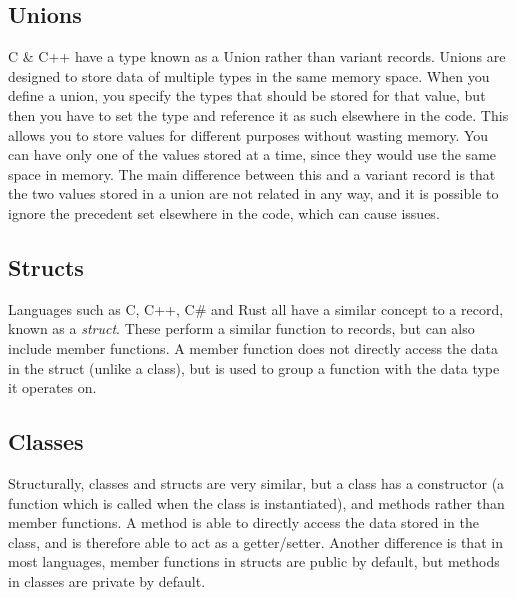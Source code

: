 \subsection*{Unions}

C \& C++ have a type known as a Union rather than variant records. Unions are designed to store data of multiple types
 in the same memory space. When you define a union, you specify the types that should be stored for that value, but then
 you have to set the type and reference it as such elsewhere in the code. This allows you to store values for different
 purposes without wasting memory. You can have only one of the values stored at a time, since they would use the same
 space in memory. The main difference between this and a variant record is that the two values stored in a union are not
 related in any way, and it is possible to ignore the precedent set elsewhere in the code, which can cause issues.

\subsection*{Structs}

Languages such as C, C++, C\# and Rust all have a similar concept to a record, known as a \textit{struct}. These perform
 a similar function to records, but can also include member functions. A member function does not directly access the
 data in the struct (unlike a class), but is used to group a function with the data type it operates on.

\subsection*{Classes}

Structurally, classes and structs are very similar, but a class has a constructor (a function which is called when the
 class is instantiated), and methods rather than member functions. A method is able to directly access the data stored
 in the class, and is therefore able to act as a getter/setter. Another difference is that in most languages, member
 functions in structs are public by default, but methods in classes are private by default.